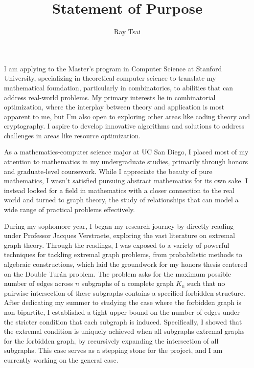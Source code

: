 \documentclass[12pt]{article}
\title{Statement of Purpose}
\author{Ray Tsai}
\date{}
\begin{document}
\maketitle

\vspace{-0.25in}

I am applying to the Master's program in Computer Science at Stanford University, specializing in theoretical computer science to translate my mathematical foundation, particularly in combinatorics, to abilities that can address real-world problems. My primary interests lie in combinatorial optimization, where the interplay between theory and application is most apparent to me, but I'm also open to exploring other areas like coding theory and cryptography. I aspire to develop innovative algorithms and solutions to address challenges in areas like resource optimization.

As a mathematics-computer science major at UC San Diego, I placed most of my attention to mathematics in my undergraduate studies, primarily through honors and graduate-level coursework. While I appreciate the beauty of pure mathematics, I wasn't satisfied pursuing abstract mathematics for its own sake. I instead looked for a field in mathematics with a closer connection to the real world and turned to graph theory, the study of relationships that can model a wide range of practical problems effectively.

During my sophomore year, I began my research journey by directly reading under Professor Jacques Verstraete, exploring the vast literature on extremal graph theory. Through the readings, I was exposed to a variety of powerful techniques for tackling extremal graph problems, from probabilistic methods to algebraic constructions, which laid the groundwork for my honors thesis centered on the Double Turán problem. The problem asks for the maximum possible number of edges across $n$ subgraphs of a complete graph $K_n$ such that no pairwise intersection of these subgraphs contains a specified forbidden structure. After dedicating my summer to studying the case where the forbidden graph is non-bipartite, I established a tight upper bound on the number of edges under the stricter condition that each subgraph is induced. Specifically, I showed that the extremal condition is uniquely achieved when all subgraphs extremal graphs for the forbidden graph, by recursively expanding the intersection
of all subgraphs. This case serves as a stepping stone for the project, and I am currently working on the general case. 
\end{document}
